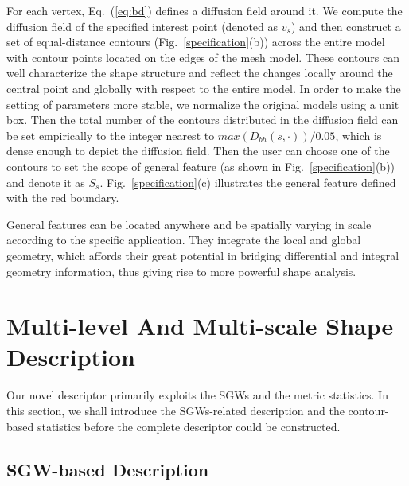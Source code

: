 For each vertex, Eq.~(\ref{eq:bd}) defines a
  diffusion field around it. We compute the diffusion field of the
specified interest point (denoted as $v_s$) and then construct a set
of equal-distance contours (Fig.~\ref{specification}(b)) across the
entire model with contour points located on the edges of the mesh
model. These contours can well characterize the shape structure and
reflect the changes locally around the central point and globally with
respect to the entire model. In order to make the
setting of parameters more stable, we normalize the original models
using a unit box. Then the total number of the contours distributed
in the diffusion field can be set empirically to the integer nearest
to $max(D_{bh}(s,\cdot))/0.05$, which is dense enough to depict the
diffusion field. Then the user can choose one of the contours to set
the scope of general feature (as shown in
Fig.~\ref{specification}(b)) and denote it as $S_{s}$.
Fig.~\ref{specification}(c) illustrates the general feature defined
with the red boundary.

General features can be located anywhere and be spatially varying in
scale according to the specific application. They integrate the
local and global geometry, which affords their great potential in
bridging differential and integral geometry information, thus giving
rise to more powerful shape analysis.


\section{Multi-level And Multi-scale Shape Description}
\label{sec:Des}

Our novel descriptor primarily exploits the SGWs and the metric statistics.
In this section, we shall introduce the SGWs-related description and the
contour-based statistics before the complete descriptor could be constructed.

\subsection{SGW-based Description}

